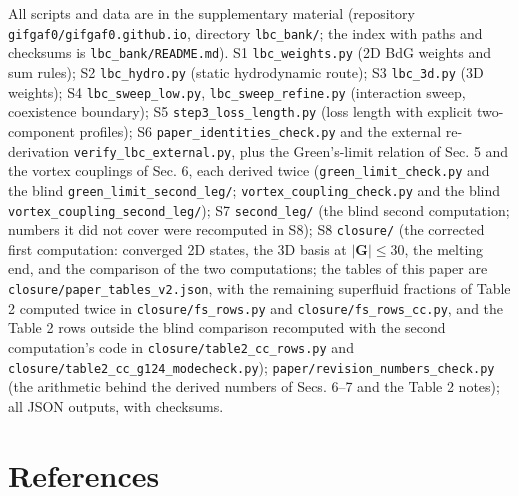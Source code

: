 \documentclass[
  11pt,
]{article}
\begin{document}
\begingroup\raggedright

All scripts and data are in the supplementary material (repository
\texttt{gifgaf0/gifgaf0.github.io}, directory \texttt{lbc\_bank/}; the
index with paths and checksums is \texttt{lbc\_bank/README.md}). S1
\texttt{lbc\_weights.py} (2D BdG weights and sum rules); S2
\texttt{lbc\_hydro.py} (static hydrodynamic route); S3
\texttt{lbc\_3d.py} (3D weights); S4 \texttt{lbc\_sweep\_low.py},
\texttt{lbc\_sweep\_refine.py} (interaction sweep, coexistence
boundary); S5 \texttt{step3\_loss\_length.py} (loss length with explicit
two-component profiles); S6 \texttt{paper\_identities\_check.py} and the
external re-derivation \texttt{verify\_lbc\_external.py}, plus the
Green's-limit relation of Sec. 5 and the vortex couplings of Sec. 6,
each derived twice (\texttt{green\_limit\_check.py} and the blind
\texttt{green\_limit\_second\_leg/}; \texttt{vortex\_coupling\_check.py}
and the blind \texttt{vortex\_coupling\_second\_leg/}); S7
\texttt{second\_leg/} (the blind second computation; numbers it did not
cover were recomputed in S8); S8 \texttt{closure/} (the corrected first
computation: converged 2D states, the 3D basis at \(|\mathbf G|\le30\),
the melting end, and the comparison of the two computations; the tables
of this paper are \texttt{closure/paper\_tables\_v2.json}, with the
remaining superfluid fractions of Table 2 computed twice in
\texttt{closure/fs\_rows.py} and \texttt{closure/fs\_rows\_cc.py}, and
the Table 2 rows outside the blind comparison recomputed with the second
computation's code in \texttt{closure/table2\_cc\_rows.py} and
\texttt{closure/table2\_cc\_g124\_modecheck.py});
\texttt{paper/revision\_numbers\_check.py} (the arithmetic behind the
derived numbers of Secs. 6--7 and the Table 2 notes); all JSON outputs,
with checksums.

\par\endgroup

\hypertarget{references}{%
\section{References}\label{references}}
\end{document}
